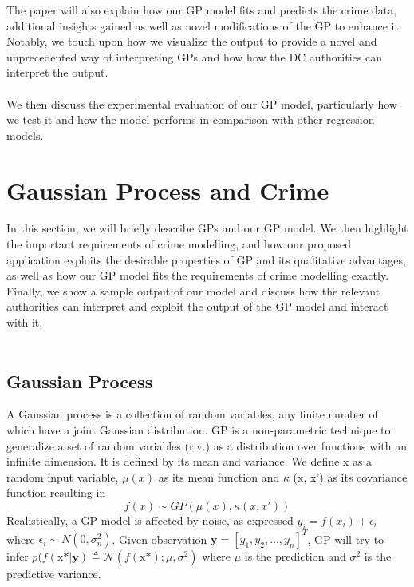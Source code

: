 \documentclass[letterpaper]{article}
\begin{document}
	The paper will also explain how our GP model fits and predicts the crime data, additional insights gained as well as novel modifications of the GP to enhance it. 
	Notably, we touch upon how we visualize the output to provide a novel and unprecedented way of interpreting GPs and how how the DC authorities can interpret the output.\\ \\

	We then discuss the experimental evaluation of our GP model, particularly how we test it and how the model performs in comparison with other regression models. 
	
	\section{Gaussian Process and Crime}

	In this section, we will briefly describe GPs and our GP model. We then highlight the important requirements of crime modelling, and how our proposed application exploits the desirable properties of GP and its qualitative advantages, as well as how our GP model fits the requirements of crime modelling exactly. 
	Finally, we show a sample output of our model and discuss how the relevant authorities can interpret and exploit the output of the GP model and interact with it.\\ \\

	\subsection{Gaussian Process}
	
	A Gaussian process is a collection of random variables, any finite number of which have a joint Gaussian distribution.
	GP is a non-parametric technique to generalize a set of random variables (r.v.) as a distribution over functions with an infinite dimension. \cite{c01}
	It is defined by its mean and variance. We define x as a random input variable, $\mu (x)$ as its mean function and $\kappa$ (x, x') as its covariance function resulting in \[f(x) \sim GP(\mu (x), \kappa (x, x')) \]
	Realistically, a GP model is affected by noise, as expressed $y_i = f(x_i) + \epsilon_i$ where $\epsilon_i \sim N(0, \sigma^2_n)$.
	Given observation $\mathbf{y} = [y_1, y_2, \ldots, y_n]^T$, GP will try to infer  $ p(f(\text{x*} | \textbf{y}) \triangleq \mathcal{N}(f(\text{x*}); \mu, \sigma^2)$ where $\mu$ is the prediction and $\sigma^2$ is the predictive variance. 
	
\end{document}
